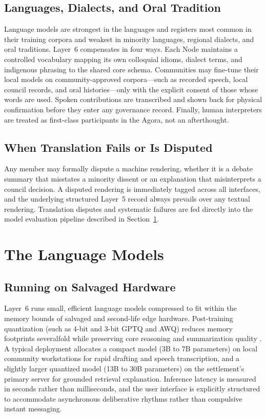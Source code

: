 \subsection{Languages, Dialects, and Oral Tradition}

Language models are strongest in the languages and registers most common in their training corpora and weakest in minority languages, regional dialects, and oral traditions. Layer~6 compensates in four ways. Each Node maintains a controlled vocabulary mapping its own colloquial idioms, dialect terms, and indigenous phrasing to the shared core schema. Communities may fine-tune their local models on community-approved corpora---such as recorded speech, local council records, and oral histories---only with the explicit consent of those whose words are used. Spoken contributions are transcribed and shown back for physical confirmation before they enter any governance record. Finally, human interpreters are treated as first-class participants in the Agora, not an afterthought.

\subsection{When Translation Fails or Is Disputed}

Any member may formally dispute a machine rendering, whether it is a debate summary that misstates a minority dissent or an explanation that misinterprets a council decision. A disputed rendering is immediately tagged across all interfaces, and the underlying structured Layer~5 record always prevails over any textual rendering. Translation disputes and systematic failures are fed directly into the model evaluation pipeline described in Section~\ref{sec:l6-models}.

\section{The Language Models}
\label{sec:l6-models}

\subsection{Running on Salvaged Hardware}

Layer~6 runs small, efficient language models compressed to fit within the memory bounds of salvaged and second-life edge hardware. Post-training quantization (such as 4-bit and 3-bit GPTQ and AWQ) reduces memory footprints severalfold while preserving core reasoning and summarization quality \parencite{frantar2023gptq}. A typical deployment allocates a compact model (3B to 7B parameters) on local community workstations for rapid drafting and speech transcription, and a slightly larger quantized model (13B to 30B parameters) on the settlement's primary server for grounded retrieval explanation. Inference latency is measured in seconds rather than milliseconds, and the user interface is explicitly structured to accommodate asynchronous deliberative rhythms rather than compulsive instant messaging.

